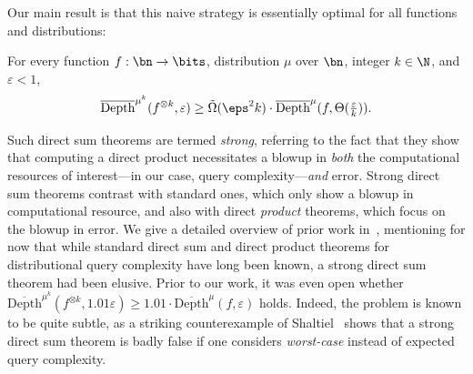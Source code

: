 Our main result is that this naive strategy is essentially optimal for all functions and distributions:\medskip 

\begin{tcolorbox}[colback = white,arc=1mm, boxrule=0.25mm]
\begin{theorem}
\label{thm:main-intro}
For every function $f: \bn \to \bits$, distribution $\mu$  over $\bn$, integer $k \in \N$, and $\varepsilon < 1$, 
\[ \overline{\mathrm{Depth}}^{\mu^k}(f^{\otimes k},\varepsilon) \ge \tilde{\Omega}(\eps^2k) \cdot \overline{\mathrm{Depth}}^{\mu}(f,\Theta(\tfrac{\varepsilon}{k})).\]
\end{theorem}
\end{tcolorbox}
\medskip 

Such direct sum theorems are termed {\sl strong}, referring to the fact that they show that computing a direct product necessitates a blowup in {\sl both} the computational resources of interest---in our case, query complexity---{\sl and} error. Strong direct sum theorems contrast with standard ones, which only show a blowup in computational resource, and also with direct {\sl product} theorems, which focus  on the blowup in error. We give a detailed overview of prior work in~, mentioning for now that while standard direct sum and direct product theorems for distributional query complexity have long been known, a strong direct sum theorem had been elusive.  Prior to our work, it was even open whether 
$\overline{\mathrm{Depth}}^{\mu^k}(f^{\otimes k},1.01\varepsilon) \ge 1.01 \cdot \overline{\mathrm{Depth}}^{\mu}(f,\varepsilon)$ holds. Indeed, the problem is known to be quite subtle, as a striking counterexample of Shaltiel~\cite{Sha04} shows that a strong direct sum
theorem is badly false if one considers {\sl worst-case} instead of expected query complexity. 


